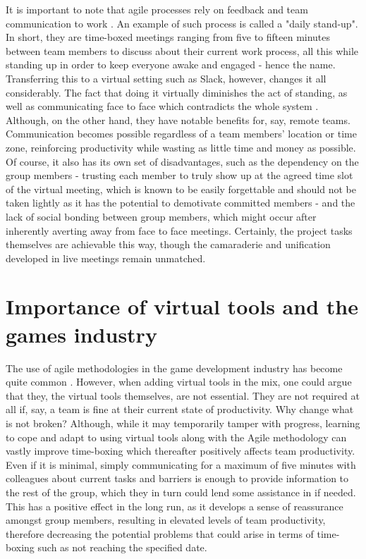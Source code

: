 \documentclass{scrartcl}
\begin{document}
It is important to note that agile processes rely on feedback and team communication to work \cite{Manifesto, Steve}. An example of such process is called a "daily stand-up". In short, they are time-boxed meetings ranging from five to fifteen minutes between team members to discuss about their current work process, all this while standing up in order to keep everyone awake and engaged - hence the name. \cite{McHugh} Transferring this to a virtual setting such as Slack, however, changes it all considerably. The fact that doing it virtually diminishes the act of standing, as well as communicating face to face which contradicts the whole system \cite{Lehmann}. Although, on the other hand, they have notable benefits for, say, remote teams. Communication becomes possible regardless of a team members' location or time zone, reinforcing productivity while wasting as little time and money as possible. Of course, it also has its own set of disadvantages, such as the dependency on the group members - trusting each member to truly show up at the agreed time slot of the virtual meeting, which is known to be easily forgettable and should not be taken lightly as it has the potential to demotivate committed members - and the lack of social bonding between group members, which might occur after inherently averting away from face to face meetings. \cite{Lehmann} Certainly, the project tasks themselves are achievable this way, though the camaraderie and unification developed in live meetings remain unmatched.

\section{Importance of virtual tools and the games industry}
The use of agile methodologies in the game development industry has become quite common \cite{Andre}. However, when adding virtual tools in the mix, one could argue that they, the virtual tools themselves, are not essential. They are not required at all if, say, a team is fine at their current state of productivity. Why change what is not broken? Although, while it may temporarily tamper with progress, learning to cope and adapt to using virtual tools along with the Agile methodology can vastly improve time-boxing which thereafter positively affects team productivity. Even if it is minimal, simply communicating for a maximum of five minutes with colleagues about current tasks and barriers is enough to provide information to the rest of the group, which they in turn could lend some assistance in if needed. This has a positive effect in the long run, as it develops a sense of reassurance amongst group members, resulting in elevated levels of team productivity, therefore decreasing the potential problems that could arise in terms of time-boxing such as not reaching the specified date.
\end{document}

